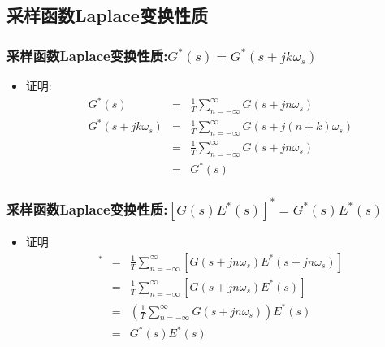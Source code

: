 \documentclass[table]{beamer}
\begin{document}
\subsection{采样函数Laplace变换性质}
\label{sec-2-2}
\begin{frame}
\frametitle{采样函数Laplace变换性质:$G^*(s)=G^*(s+jk\omega_s)$}
\label{sec-2-2-1}

\begin{itemize}
\item <2-> 证明:
     \begin{eqnarray*}
     G^*(s) &=& \frac{1}{T}\sum_{n=-\infty}^{\infty}G(s+jn\omega_s) \\
     G^*(s+jk\omega_s) &=& \frac{1}{T}\sum_{n=-\infty}^{\infty}G(s+j(n+k)\omega_s) \\
      &=& \frac{1}{T}\sum_{n=-\infty}^{\infty}G(s+jn\omega_s)\\
      &=& G^*(s)
     \end{eqnarray*}
\end{itemize}
\end{frame}
\begin{frame}
\frametitle{采样函数Laplace变换性质:$[G(s)E^*(s)]^*=G^*(s)E^*(s)$}
\label{sec-2-2-2}

\begin{itemize}
\item <2-> 证明
     \begin{eqnarray*}
     [G(s)E^*(s)]^* &= & \frac{1}{T}\sum_{n=-\infty}^{\infty}[G(s+jn\omega_s)E^*(s+jn\omega_s)] \\
      &=& \frac{1}{T}\sum_{n=-\infty}^{\infty}[G(s+jn\omega_s)E^*(s)] \\
      &=& (\frac{1}{T}\sum_{n=-\infty}^{\infty}G(s+jn\omega_s))E^*(s) \\
      &=& G^*(s)E^*(s)
     \end{eqnarray*}
\end{itemize}
\end{frame}
\end{document}
